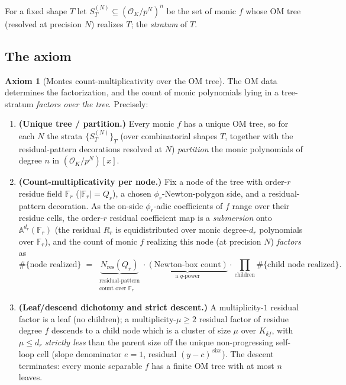\documentclass[11pt]{article}
\theoremstyle{definition}
\newtheorem{axiom}{Axiom}
\theoremstyle{remark}
\newcommand{\OK}{\mathcal{O}_K}
\newcommand{\Fr}{\mathbb{F}_r}
\begin{document}
For a fixed shape $T$ let $S_T^{(N)}\subseteq(\OK/p^N)^n$ be the set of monic $f$
whose OM tree (resolved at precision $N$) realizes $T$; the \emph{stratum} of $T$.

\subsection{The axiom}

\begin{axiom}[Montes count-multiplicativity over the OM tree]\label{ax:montes}
The OM data determines the factorization, and the count of monic polynomials lying
in a tree-stratum \emph{factors over the tree}. Precisely:
\begin{enumerate}[label=\textup{(\arabic*)},nosep]
\item\label{ax:partition} \textbf{(Unique tree / partition.)} Every monic $f$ has a
unique OM tree, so for each $N$ the strata $\{S_T^{(N)}\}_T$ (over combinatorial
shapes $T$, together with the residual-pattern decorations resolved at $N$)
\emph{partition} the monic polynomials of degree $n$ in $(\OK/p^N)[x]$.
\item\label{ax:multiplicativity} \textbf{(Count-multiplicativity per node.)} Fix a
node of the tree with order-$r$ residue field $\Fr$ ($|\Fr|=Q_r$), a chosen
$\phi_r$-Newton-polygon side, and a residual-pattern decoration. As the on-side
$\phi_r$-adic coefficients of $f$ range over their residue cells, the order-$r$
residual coefficient map is a \emph{submersion} onto $\mathbb A^{d_r}(\Fr)$ (the
residual $R_r$ is equidistributed over monic degree-$d_r$ polynomials over $\Fr$),
and the count of monic $f$ realizing this node (at precision $N$) \emph{factors} as
\begin{equation}\label{eq:nodefactor}
   \#\{\text{node realized}\}
   \;=\;
   \underbrace{N_{\mathrm{res}}(Q_r)}_{\substack{\text{residual-pattern}\\\text{count over }\Fr}}
   \cdot
   \underbrace{(\text{Newton-box count})}_{\text{a }q\text{-power}}
   \cdot
   \prod_{\text{children}}\#\{\text{child node realized}\}.
\end{equation}
\item\label{ax:dichotomy} \textbf{(Leaf/descend dichotomy and strict descent.)} A
multiplicity-$1$ residual factor is a leaf (no children); a multiplicity-$\mu\ge2$
residual factor of residue degree $f$ descends to a child node which is a cluster
of size $\mu$ over $K_{\delta f}$, with $\mu\le d_r$ \emph{strictly less} than the
parent size off the unique non-progressing self-loop cell (slope denominator
$e=1$, residual $(y-c)^{\,\text{size}}$). The descent terminates: every monic
separable $f$ has a finite OM tree with at most $n$ leaves.
\end{enumerate}
\end{axiom}
\end{document}

